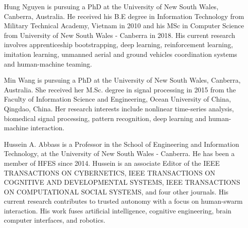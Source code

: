 \documentclass[journal]{IEEEtran}
\begin{document}
\begin{IEEEbiography}{Hung Nguyen} is pursuing a PhD at the University of New South Wales, Canberra, Australia. He received his B.E degree in Information Technology from Military Technical Academy, Vietnam in 2010 and his MSc in Computer Science from University of New South Wales - Canberra in 2018. His current research involves apprenticeship bootstrapping, deep learning, reinforcement learning, imitation learning, unmanned aerial and ground vehicles coordination systems and human-machine teaming. 
\end{IEEEbiography}

\begin{IEEEbiography}{Min Wang} is pursuing a PhD at the University of New South Wales, Canberra, Australia. She received her M.Sc. degree in signal processing in 2015 from the Faculty of Information Science and Engineering, Ocean University of China, Qingdao, China. Her research interests include nonlinear time-series analysis, biomedical signal processing, pattern recognition, deep learning and human-machine interaction.
\end{IEEEbiography}

\begin{IEEEbiography}{Hussein A. Abbass} is a Professor in the School of Engineering and Information Technology, at the University of New South Wales - Canberra. He has been a member of HFES since 2014. Hussein is an associate Editor of the IEEE TRANSACTIONS ON CYBERNETICS, IEEE TRANSACTIONS ON COGNITIVE AND DEVELOPMENTAL SYSTEMS, IEEE TRANSACTIONS ON COMPUTATIONAL SOCIAL SYSTEMS, and four other journals. His current research contributes to trusted autonomy with a focus on human-swarm interaction. His work fuses artificial intelligence, cognitive engineering, brain computer interfaces, and robotics. 
\end{IEEEbiography}
\end{document}
